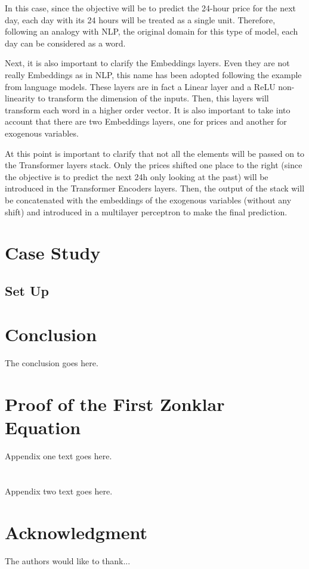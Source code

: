 \documentclass[journal]{IEEEtran}
\begin{document}
In this case, since the objective will be to predict the 24-hour price for the next day, each day with its 24 hours will be treated as a single unit. Therefore, following an analogy with NLP, the original domain for this type of model, each day can be considered as a word.

Next, it is also important to clarify the Embeddings layers. Even they are not really Embeddings as in NLP, this name has been adopted following the example from language models. These layers are in fact a Linear layer and a ReLU non-linearity to transform the dimension of the inputs. Then, this layers will transform each word in a higher order vector. It is also important to take into account that there are two Embeddings layers, one for prices and another for exogenous variables. 

At this point is important to clarify that not all the elements will be passed on to the Transformer layers stack. Only the prices shifted one place to the right (since the objective is to predict the next 24h only looking at the past) will be introduced in the Transformer Encoders layers. Then, the output of the stack will be concatenated with the embeddings of the exogenous variables (without any shift) and introduced in a multilayer perceptron to make the final prediction.


\section{Case Study}

\subsection{Set Up}


\section{Conclusion}
The conclusion goes here.


\appendices
\section{Proof of the First Zonklar Equation}
Appendix one text goes here.

\section{}
Appendix two text goes here.


\section*{Acknowledgment}


The authors would like to thank...


\ifCLASSOPTIONcaptionsoff
  \newpage
\fi







\end{document}
